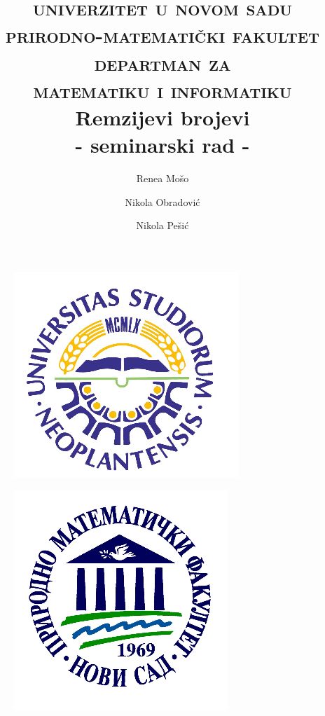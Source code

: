 \documentclass[12pt,a4paper]{article}
\title{\vspace{-2.3cm}\Large \textsc{univerzitet u novom sadu
\\prirodno-matematički fakultet
\\departman za
\\matematiku i informatiku}
\vspace{5em} 
\\ \textbf{Remzijevi brojevi}
\\ \large - seminarski rad -
\vspace{1em} }
\begin{document}
	\begin{figure}[]
	\centering
	\advance\leftskip-14cm
	\includegraphics[scale=0.3]{logo1.png}
	\end{figure}
	

	\begin{figure}[]
	\vspace{-3.4cm}
	\centering
	\advance{}
	\includegraphics[scale=0.3]{logo2.png}
	\end{figure}

	\author{
  	Renea Mošo\\
  	\texttt{}
  	\and
  	Nikola Obradović\\
  	\texttt{}
  	\and
  	Nikola Pešić
	}	
	\date{}
	
	
	\maketitle
	
	\thispagestyle{empty}
	
	\newpage
	
\end{document}
